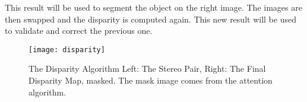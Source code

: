 This result will be used to segment the object on the right image. The images are then swapped and the disparity is computed again. This new result will be used to validate and correct the previous one.

\begin{figure}
\centering
\texttt{[image: disparity]}
\caption{The Disparity Algorithm  Left: The Stereo Pair, Right: The Final Disparity Map, masked. The mask image comes from the attention algorithm.}
\label{disparity}
\end{figure}
